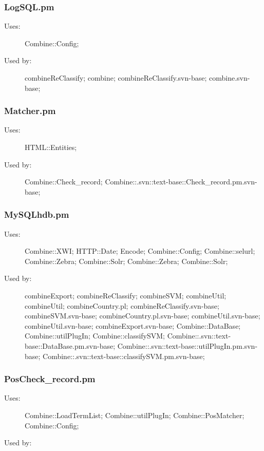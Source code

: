 \subsubsection{LogSQL.pm}
\begin{description}
\item[Uses:] Combine::Config; 

\item[Used by:] combineReClassify; combine; combineReClassify.svn-base; combine.svn-base; 

\end{description}
\subsubsection{Matcher.pm}
\begin{description}
\item[Uses:] HTML::Entities; 

\item[Used by:] Combine::Check\_record; Combine::.svn::text-base::Check\_record.pm.svn-base; 

\end{description}
\subsubsection{MySQLhdb.pm}
\begin{description}
\item[Uses:] Combine::XWI; HTTP::Date; Encode; Combine::Config; Combine::selurl; Combine::Zebra; Combine::Solr; Combine::Zebra; Combine::Solr; 

\item[Used by:] combineExport; combineReClassify; combineSVM; combineUtil; combineUtil; combineCountry.pl; combineReClassify.svn-base; combineSVM.svn-base; combineCountry.pl.svn-base; combineUtil.svn-base; combineUtil.svn-base; combineExport.svn-base; Combine::DataBase; Combine::utilPlugIn; Combine::classifySVM; Combine::.svn::text-base::DataBase.pm.svn-base; Combine::.svn::text-base::utilPlugIn.pm.svn-base; Combine::.svn::text-base::classifySVM.pm.svn-base; 

\end{description}
\subsubsection{PosCheck\_record.pm}
\begin{description}
\item[Uses:] Combine::LoadTermList; Combine::utilPlugIn; Combine::PosMatcher; Combine::Config; 

\item[Used by:] 

\end{description}
